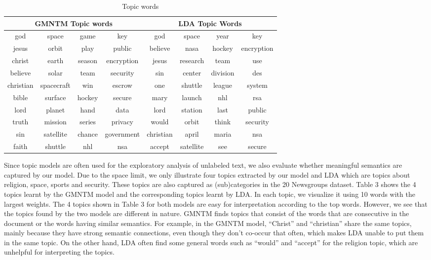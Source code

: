 \documentclass[english,letter]{article}
\providecommand{\tabularnewline}{\\}
\renewcommand\[{\begin{equation}}
\renewcommand\]{\end{equation}}
\begin{document}
\begin{table}[!t]
\renewcommand{\arraystretch}{1.3}

\begin{centering}
\begin{tabular}{|c|c|c|c|c|c|c|c|}
\hline
\multicolumn{4}{|c|}{GMNTM Topic words} & \multicolumn{4}{c|}{LDA Topic Words}\tabularnewline
\hline
god & space & game & key & god & space & year & key\tabularnewline
jesus & orbit & play & public & believe & nasa & hockey & encryption\tabularnewline
christ & earth & season & encryption & jesus & research & team & use\tabularnewline
believe & solar & team & security & sin & center & division & des\tabularnewline
christian & spacecraft & win & escrow & one & shuttle & league & system\tabularnewline
bible & surface & hockey & secure & mary & launch & nhl & rsa\tabularnewline
lord & planet & hand & data & lord & station & last & public\tabularnewline
truth & mission & series & privacy & would & orbit & think & security\tabularnewline
sin & satellite & chance & government & christian & april & maria & nsa\tabularnewline
faith & shuttle & nhl & nsa & accept & satellite & see & secure\tabularnewline
\hline
\end{tabular}
\par\end{centering}

\protect\caption{Topic words}
\end{table}


Since topic models are often used for the exploratory analysis of
unlabeled text, we also evaluate whether meaningful semantics are
captured by our model. Due to the space limit, we only illustrate
four topics extracted by our model and LDA which are topics about
religion, space, sports and security. These topics are also captured
as (sub)categories in the 20 Newsgroups dataset. Table 3 shows the
4 topics learnt by the GMNTM model and the corresponding topics learnt
by LDA. In each topic, we visualize it using 10 words with the largest
weights. The 4 topics shown in Table 3 for both models are easy for
interpretation according to the top words. However, we see that the
topics found by the two models are different in nature. GMNTM finds
topics that consist of the words that are consecutive in the document
or the words having similar semantics. For example, in the GMNTM model,
\textquotedblleft Christ\textquotedblright{} and \textquotedblleft christian\textquotedblright{}
share the same topics, mainly because they have strong semantic connections,
even though they don't co-occur that often, which makes LDA unable
to put them in the same topic. On the other hand, LDA often find some
general words such as \textquotedblleft would\textquotedblright{}
and \textquotedblleft accept\textquotedblright{} for the religion
topic, which are unhelpful for interpreting the topics.
\end{document}
